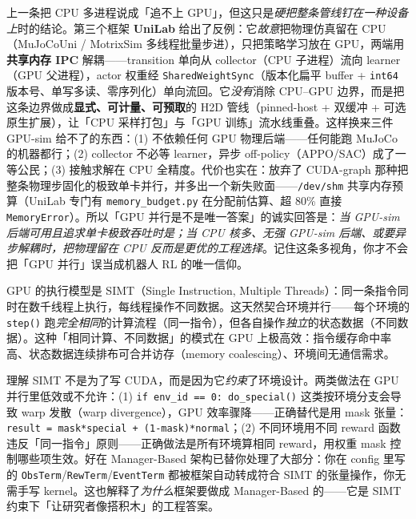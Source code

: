 \begin{insight}\label{ins:rlmc-eco-heterogeneous}
上一条把 CPU 多进程说成「追不上 GPU」，但这只是\emph{硬把整条管线钉在一种设备上}时的结论。第三个框架 \textbf{UniLab} 给出了反例：它\emph{故意}把物理仿真留在 CPU（MuJoCoUni / MotrixSim 多线程批量步进），只把策略学习放在 GPU，两端用\textbf{共享内存 IPC} 解耦——transition 单向从 collector（CPU 子进程）流向 learner（GPU 父进程），actor 权重经 \verb|SharedWeightSync|（版本化扁平 buffer + \verb|int64| 版本号、单写多读、零序列化）单向流回。它\emph{没有}消除 CPU--GPU 边界，而是把这条边界做成\textbf{显式、可计量、可预取}的 H2D 管线（pinned-host + 双缓冲 + 可选原生扩展），让「CPU 采样打包」与「GPU 训练」流水线重叠。这样换来三件 GPU-sim 给不了的东西：(1) 不依赖任何 GPU 物理后端——任何能跑 MuJoCo 的机器都行；(2) collector 不必等 learner，异步 off-policy（APPO/SAC）成了一等公民；(3) 接触求解在 CPU 全精度。代价也实在：放弃了 CUDA-graph 那种把整条物理步固化的极致单卡并行，并多出一个新失败面——\verb|/dev/shm| 共享内存预算（UniLab 专门有 \verb|memory_budget.py| 在分配前估算、超 80\% 直接 \verb|MemoryError|）。所以「GPU 并行是不是唯一答案」的诚实回答是：\emph{当 GPU-sim 后端可用且追求单卡极致吞吐时是；当 CPU 核多、无强 GPU-sim 后端、或要异步解耦时，把物理留在 CPU 反而是更优的工程选择}。记住这条多视角，你才不会把「GPU 并行」误当成机器人 RL 的唯一信仰。
\end{insight}

GPU 的执行模型是 SIMT（Single Instruction, Multiple Threads）：同一条指令同时在数千线程上执行，每线程操作不同数据。这天然契合环境并行——每个环境的 \verb|step()| 跑\emph{完全相同}的计算流程（同一指令），但各自操作\emph{独立}的状态数据（不同数据）。这种「相同计算、不同数据」的模式在 GPU 上极高效：指令缓存命中率高、状态数据连续排布可合并访存（memory coalescing）、环境间无通信需求。

\begin{insight}\label{ins:rlmc-eco-simt}
理解 SIMT 不是为了写 CUDA，而是因为它\emph{约束}了环境设计。两类做法在 GPU 并行里低效或不允许：(1) \verb|if env_id == 0: do_special()| 这类按环境分支会导致 warp 发散（warp divergence），GPU 效率骤降——正确替代是用 mask 张量：\verb|result = mask*special + (1-mask)*normal|；(2) 不同环境用不同 reward 函数违反「同一指令」原则——正确做法是所有环境算相同 reward，用权重 mask 控制哪些项生效。好在 Manager-Based 架构已替你处理了大部分：你在 config 里写的 \verb|ObsTerm|/\verb|RewTerm|/\verb|EventTerm| 都被框架自动转成符合 SIMT 的张量操作，你无需手写 kernel。这也解释了\emph{为什么}框架要做成 Manager-Based 的——它是 SIMT 约束下「让研究者像搭积木」的工程答案。
\end{insight}

